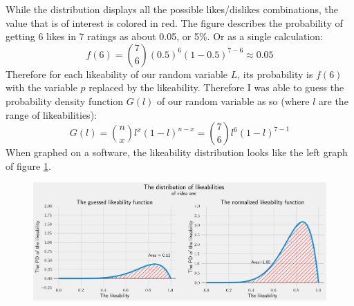 \documentclass[a4paper,11pt]{article}
\begin{document}
While the distribution displays all the possible likes/dislikes combinations, the value that is of interest is colored in red. The figure describes the probability of getting 6 likes in 7 ratings as about 0.05, or 5\%. Or as a single calculation:
\[
    f(6) = {7 \choose 6} (0.5)^6 (1-0.5)^{7-6} \approx 0.05
\]
Therefore for each likeability of our random variable $L$, its probability is $f(6)$ with the variable $p$ replaced by the likeability. Therefore I was able to guess the probability density function $G(l)$ of our random variable as so (where $l$ are the range of likeabilities):
\[
    G(l) = {n \choose x} l^x (1-l)^{n-x} = {7 \choose 6} l^6 (1-l) ^{7-1}
\]
When graphed on a software, the likeability distribution looks like the left graph of figure \ref{fig:beta}.

\begin{figure}[H]
    \centering
    \includegraphics[width=1\textwidth]{assets/beta_pdfs.png}
    \caption{}
    \label{fig:beta}
\end{figure}
\end{document}
